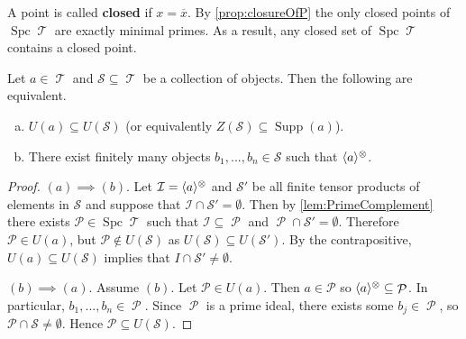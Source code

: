 \documentclass[11pt]{article}
\DeclareMathOperator{\TT}{\mathcal{T}}
\DeclareMathOperator{\cP}{\mathcal{P}}
\DeclareMathOperator{\supp}{Supp}
\DeclareMathOperator{\spc}{Spc}
\begin{document}
\begin{rmk}
A point is called \textbf{closed} if $x = \overline{x}$. By \autoref{prop:closureOfP} the only closed points of $\spc\TT$ are exactly minimal primes. As a result, any closed set of $\spc \TT$ contains a closed point. 
\end{rmk}

\begin{lem}\label{lem:ZinSuppa}
Let $a \in \TT$ and $\mathcal{S} \subseteq \TT$ be a collection of objects. Then the following are equivalent.
\begin{enumerate}[(a)]
	\item $U(a) \subseteq U(\mathcal{S})$ (or equivalently $Z(\mathcal{S}) \subseteq \supp(a)$).
	\item There exist finitely many objects $b_1,...,b_n \in \mathcal{S}$ such that $\langle a \rangle^{\otimes}$.
\end{enumerate}
\end{lem}
\begin{proof}
$(a) \implies (b)$. Let $\mathcal{I} = \langle a \rangle^{\otimes}$ and $\mathcal{S}'$ be all finite tensor products of elements in $\mathcal{S}$ and suppose that $\mathcal{I} \cap \mathcal{S}' = \emptyset$. Then by \autoref{lem:PrimeComplement} there exists $\mathcal{P} \in \spc \TT$ such that $\mathcal{I} \subseteq \cP$ and $\cP \cap \mathcal{S}' = \emptyset$. Therefore $\mathcal{P} \in U(a)$, but $\mathcal{P} \not\in U(\mathcal{S})$ as $U(\mathcal{S}) \subseteq U(\mathcal{S}')$. By the contrapositive, $U(a) \subseteq U(\mathcal{S})$ implies that $I \cap \mathcal{S}' \not = \emptyset$.

$(b) \implies (a)$. Assume $(b)$. Let $\mathcal{P} \in U(a)$. Then $a \in \mathcal{P}$ so $\la a \ra^{\otimes} \subseteq \cP$. In particular, $ b_1,...,b_n \in \cP$. Since $\cP$ is a prime ideal, there exists some $b_j \in \cP$, so $\mathcal{P} \cap \mathcal{S} \not = \emptyset$. Hence $\mathcal{P} \subseteq U(\mathcal{S})$. 
\end{proof}
\end{document}
